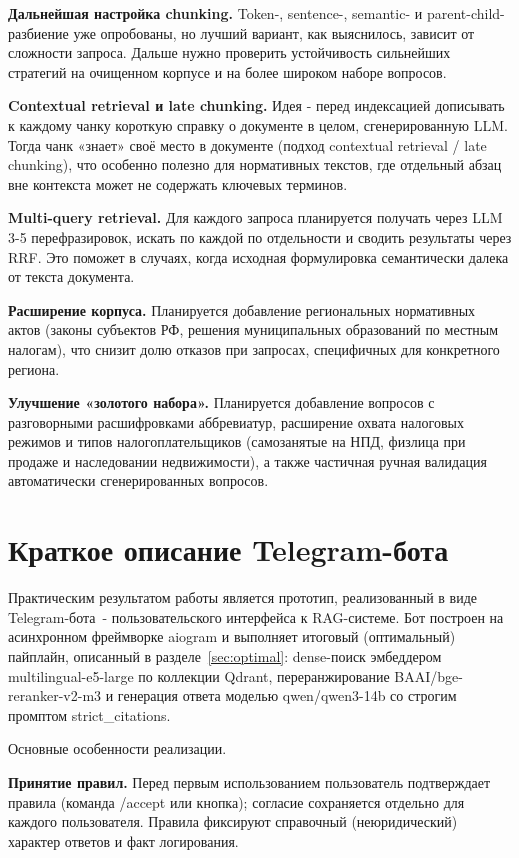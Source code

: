 \documentclass[a4paper,12pt]{article}
\begin{document}
\textbf{Дальнейшая настройка chunking.} Token-, sentence-, semantic- и parent-child-разбиение уже опробованы, но лучший вариант, как выяснилось, зависит от сложности запроса. Дальше нужно проверить устойчивость сильнейших стратегий на очищенном корпусе и на более широком наборе вопросов.

\textbf{Contextual retrieval и late chunking.} Идея - перед индексацией дописывать к каждому чанку короткую справку о документе в целом, сгенерированную LLM. Тогда чанк «знает» своё место в документе (подход contextual retrieval / late chunking), что особенно полезно для нормативных текстов, где отдельный абзац вне контекста может не содержать ключевых терминов.

\textbf{Multi-query retrieval.} Для каждого запроса планируется получать через LLM 3-5 перефразировок, искать по каждой по отдельности и сводить результаты через RRF. Это поможет в случаях, когда исходная формулировка семантически далека от текста документа.

\textbf{Расширение корпуса.} Планируется добавление региональных нормативных актов (законы субъектов РФ, решения муниципальных образований по местным налогам), что снизит долю отказов при запросах, специфичных для конкретного региона.

\textbf{Улучшение «золотого набора».} Планируется добавление вопросов с разговорными расшифровками аббревиатур, расширение охвата налоговых режимов и типов налогоплательщиков (самозанятые на НПД, физлица при продаже и наследовании недвижимости), а также частичная ручная валидация автоматически сгенерированных вопросов.

\newpage
\section{Краткое описание Telegram-бота}
\label{sec:bot}

Практическим результатом работы является прототип, реализованный в виде Telegram-бота~- пользовательского интерфейса к RAG-системе. Бот построен на асинхронном фреймворке aiogram и выполняет итоговый (оптимальный) пайплайн, описанный в разделе~\ref{sec:optimal}: dense-поиск эмбеддером multilingual-e5-large по коллекции Qdrant, переранжирование BAAI/bge-reranker-v2-m3 и генерация ответа моделью qwen/qwen3-14b со строгим промптом strict\_citations.

Основные особенности реализации.

\textbf{Принятие правил.} Перед первым использованием пользователь подтверждает правила (команда /accept или кнопка); согласие сохраняется отдельно для каждого пользователя. Правила фиксируют справочный (неюридический) характер ответов и факт логирования.
\end{document}
